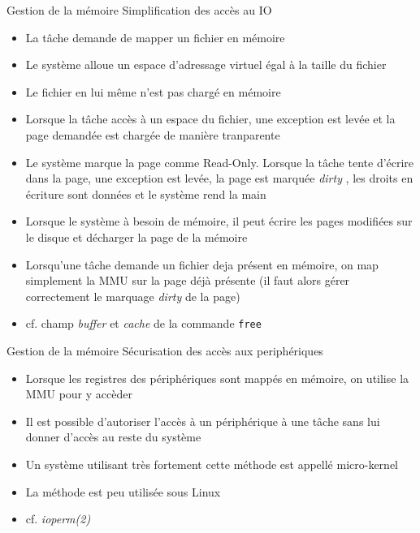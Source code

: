 \begin{frame}{Gestion de la mémoire}
  Simplification des accès au IO
  \begin{itemize} 
  \item La tâche demande de mapper un fichier en mémoire
  \item  Le système  alloue un  espace d'adressage  virtuel égal  à la
    taille du fichier
  \item Le fichier en lui même n'est pas chargé en mémoire
  \item Lorsque la  tâche accès à un espace  du fichier, une exception
    est levée et la page demandée est chargée de manière tranparente
  \item Le  système marque la  page comme Read-Only. Lorsque  la tâche
    tente d'écrire dans la page,  une exception est levée, la page est
    marquée \emph{dirty}  , les  droits en écriture  sont données  et le
    système rend la main
  \item Lorsque  le système  à besoin de  mémoire, il peut  écrire les
    pages modifiées sur le disque et décharger la page de la mémoire
  \item Lorsqu'une  tâche demande un fichier deja  présent en mémoire,
    on map simplement la MMU sur  la page déjà présente (il faut alors
    gérer correctement le marquage \emph{dirty} de la page)
  \item  cf.   champ  \emph{buffer}  et \emph{cache}  de  la  commande
    \texttt{free}
  \end{itemize}
\end{frame}

\begin{frame}{Gestion de la mémoire}
  Sécurisation des accès aux periphériques
  \begin{itemize}
  \item Lorsque  les registres des périphériques sont  mappés en mémoire,
    on utilise la MMU pour y accèder
  \item Il  est possible d'autoriser  l'accès à un périphérique  à une
    tâche sans lui donner d'accès au reste du système
  \item Un système utilisant  très fortement cette méthode est appellé
    micro-kernel
  \item La méthode est peu utilisée sous Linux
  \item cf. \emph{ioperm(2)}
  \end{itemize}
\end{frame}

